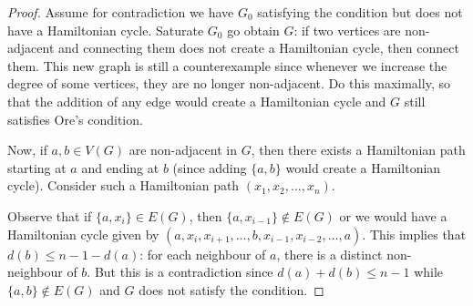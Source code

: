 \documentclass[12pt, a4paper]{book}
\theoremstyle{nonumberplain}
\newtheorem{proof}{Proof}
\begin{document}
\begin{proof}
    Assume for contradiction we have $G_0$ satisfying the condition but does not have a Hamiltonian cycle.
    Saturate $G_0$ go obtain $G$: if two vertices are non-adjacent and connecting them does not create a Hamiltonian cycle, then connect them.
    This new graph is still a counterexample since whenever we increase the degree of some vertices, they are no longer non-adjacent.
    Do this maximally, so that the addition of any edge would create a Hamiltonian cycle and $G$ still satisfies Ore's condition.

    Now, if $a,b\in V(G)$ are non-adjacent in $G$, then there exists a Hamiltonian path starting at $a$ and ending at $b$ (since adding $\{a,b\}$ would create a Hamiltonian cycle).
    Consider such a Hamiltonian path $(x_1,x_2,\ldots,x_n)$.
    \begin{center}
    \end{center}
    Observe that if $\{a,x_i\}\in E(G)$, then $\{a,x_{i-1}\}\notin E(G)$ or we would have a Hamiltonian cycle given by $(a,x_i,x_{i+1},\ldots,b,x_{i-1},x_{i-2},\ldots,a)$.
    This implies that $d(b)\leq n-1-d(a)$: for each neighbour of $a$, there is a distinct non-neighbour of $b$.
    But this is a contradiction since $d(a)+d(b)\leq n-1$ while $\{a,b\}\notin E(G)$ and $G$ does not satisfy the condition.
\end{proof}
\end{document}
